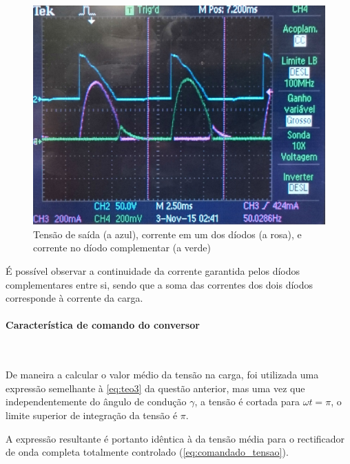 \documentclass[a4paper,11pt]{article}
\numberwithin{equation}{section}
\begin{document}
\begin{figure}[H]
	\centering
	\includegraphics[keepaspectratio=true, scale=0.12]{img/DSC_0189}
	\caption{Tensão de saída (a azul), corrente em um dos díodos (a rosa), e corrente no díodo complementar (a verde)}
	\label{fig:rsemidiodos}
	\vspace{-0.8em}
\end{figure}

É possível observar a continuidade da corrente garantida pelos díodos complementares entre si, sendo que a soma das correntes dos dois díodos corresponde à corrente da carga.

\paragraph{Característica de comando do conversor} \mbox{}\


De maneira a calcular o valor médio da tensão na carga, foi utilizada uma expressão semelhante à \autoref{eq:teo3} da questão anterior, mas uma vez que independentemente do ângulo de condução $\gamma$, a tensão é cortada para $\omega t = \pi$, o limite superior de integração da tensão é $\pi$.

A expressão resultante é portanto idêntica à da tensão média para o rectificador de onda completa totalmente controlado (\autoref{eq:comandado_tensao}).
\end{document}
